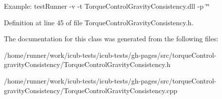 Example\+: test\+Runner -\/v -\/t Torque\+Control\+Gravity\+Consistency.\+dll -\/p \char`\"{}\char`\"{} 

Definition at line 45 of file Torque\+Control\+Gravity\+Consistency.\+h.



The documentation for this class was generated from the following files\+:\begin{DoxyCompactItemize}
\item 
/home/runner/work/icub-\/tests/icub-\/tests/gh-\/pages/src/torque\+Control-\/gravity\+Consistency/Torque\+Control\+Gravity\+Consistency.\+h\item 
/home/runner/work/icub-\/tests/icub-\/tests/gh-\/pages/src/torque\+Control-\/gravity\+Consistency/Torque\+Control\+Gravity\+Consistency.\+cpp\end{DoxyCompactItemize}
